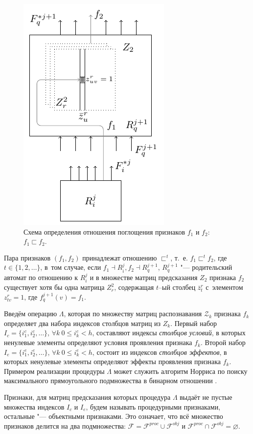 \documentclass[a4paper, 12pt]{article}
\theoremstyle{plain}
\begin{document}
	\begin{figure}[h]
		\centering
		\includegraphics[width=0.3\linewidth]{automata/meas}
		\caption{Схема определения отношения поглощения признаков $f_1$ и $f_2$: $f_1\sqsubset f_2$.}
		\label{fig:auto_measur}
	\end{figure}
			
	Пара признаков $(f_1,f_2)$ принадлежат отношению $\sqsubset^t$, т.~е. $f_1\sqsubset^t f_2$, где $t\in\{1,2,\dots\}$, в~том случае, если $f_1\dashv R_i^j, f_2\dashv R_q^{j+1}$, $R_q^{j+1}$ "--- родительский автомат по отношению к $R_i^j$ и в множестве матриц предсказания $Z_2$ признака $f_2$ существует хотя бы одна матрица $Z_r^2$, содержащая $t$–ый столбец $\bar z_t^r$ с~элементом $z_{tv}^r=1$, где $f_q^{j+1}(v)=f_1$.	
	
	Введём операцию $\Lambda$, которая по множеству матриц распознавания $\mathcal Z_k$ признака $f_k$ определяет два набора индексов столбцов матриц из $Z_k$. Первый набор $I_c=\{i_1^c,i_2^c,\dots\}$, $\forall k\ 0\leqslant i_k^c < h$, составляют индексы \textit{столбцов условий}, в которых ненулевые элементы определяют условия проявления признака $f_k$. Второй набор $I_e=\{i_1^e,i_2^e,\dots\}$, $\forall k\ 0\leqslant i_k^e < h$, состоит из индексов  \textit{столбцов эффектов}, в которых ненулевые элементы определяют эффекты проявления признака $f_k$. Примером реализации процедуры $\Lambda$ может служить алгоритм Норриса по поиску максимального прямоугольного подмножества в бинарном отношении \cite{Norris1977}.
	
	Признаки, для матриц предсказания которых процедура $\Lambda$ выдаёт не пустые множества индексов $I_c$ и $I_e$, будем называть процедурными признаками, остальные "--- объектными признаками. Это означает, что всё множество признаков делится на два подмножества: $\mathcal F=\mathcal F^{proc}\cup\mathcal F^{obj}$ и $\mathcal F^{proc}\cap\mathcal F^{obj}=\varnothing$.	
\end{document}
